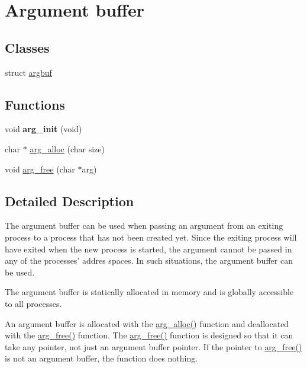 \hypertarget{group__arg}{\section{Argument buffer}
\label{group__arg}
}
\subsection*{Classes}
\begin{DoxyCompactItemize}
\item 
struct \hyperlink{structargbuf}{argbuf}
\end{DoxyCompactItemize}
\subsection*{Functions}
\begin{DoxyCompactItemize}
\item 
\hypertarget{group__arg_ga4b68a41d8ce3f5b431000ae7e61b0849}{void {\bfseries arg\-\_\-init} (void)}\label{group__arg_ga4b68a41d8ce3f5b431000ae7e61b0849}

\item 
char $\ast$ \hyperlink{group__arg_ga676976f783fae79b700abd0feb860de4}{arg\-\_\-alloc} (char size)
\item 
void \hyperlink{group__arg_gaa9a428d1b0a677fc321895add50b6231}{arg\-\_\-free} (char $\ast$arg)
\end{DoxyCompactItemize}


\subsection{Detailed Description}
The argument buffer can be used when passing an argument from an exiting process to a process that has not been created yet. Since the exiting process will have exited when the new process is started, the argument cannot be passed in any of the processes' addres spaces. In such situations, the argument buffer can be used.

The argument buffer is statically allocated in memory and is globally accessible to all processes.

An argument buffer is allocated with the \hyperlink{group__arg_ga676976f783fae79b700abd0feb860de4}{arg\-\_\-alloc()} function and deallocated with the \hyperlink{group__arg_gaa9a428d1b0a677fc321895add50b6231}{arg\-\_\-free()} function. The \hyperlink{group__arg_gaa9a428d1b0a677fc321895add50b6231}{arg\-\_\-free()} function is designed so that it can take any pointer, not just an argument buffer pointer. If the pointer to \hyperlink{group__arg_gaa9a428d1b0a677fc321895add50b6231}{arg\-\_\-free()} is not an argument buffer, the function does nothing. 

